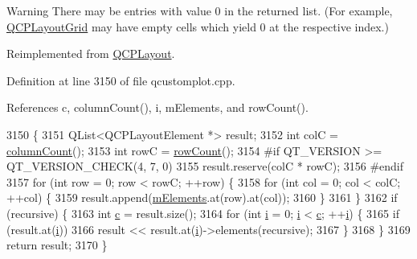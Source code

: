 \begin{DoxyWarning}{Warning}
There may be entries with value 0 in the returned list. (For example, \hyperlink{class_q_c_p_layout_grid}{Q\+C\+P\+Layout\+Grid} may have empty cells which yield 0 at the respective index.) 
\end{DoxyWarning}


Reimplemented from \hyperlink{class_q_c_p_layout_a51fe2675b53e829130b229bc1f7b0f99}{Q\+C\+P\+Layout}.



Definition at line 3150 of file qcustomplot.\+cpp.



References c, column\+Count(), i, m\+Elements, and row\+Count().


\begin{DoxyCode}
3150                                                                       \{
3151   QList<QCPLayoutElement *> result;
3152   \textcolor{keywordtype}{int} colC = \hyperlink{class_q_c_p_layout_grid_ac39074eafd148b82d0762090f258189e}{columnCount}();
3153   \textcolor{keywordtype}{int} rowC = \hyperlink{class_q_c_p_layout_grid_af8e6c7a05864ebe610c87756c7b9079c}{rowCount}();
3154 \textcolor{preprocessor}{#if QT\_VERSION >= QT\_VERSION\_CHECK(4, 7, 0)}
3155   result.reserve(colC * rowC);
3156 \textcolor{preprocessor}{#endif}
3157   \textcolor{keywordflow}{for} (\textcolor{keywordtype}{int} row = 0; row < rowC; ++row) \{
3158     \textcolor{keywordflow}{for} (\textcolor{keywordtype}{int} col = 0; col < colC; ++col) \{
3159       result.append(\hyperlink{class_q_c_p_layout_grid_a2ec4664bcfb5d479255e50f0c074f7c9}{mElements}.at(row).at(col));
3160     \}
3161   \}
3162   \textcolor{keywordflow}{if} (recursive) \{
3163     \textcolor{keywordtype}{int} \hyperlink{_comparision_pictures_2_createtest_image_8m_ae0323a9039add2978bf5b49550572c7c}{c} = result.size();
3164     \textcolor{keywordflow}{for} (\textcolor{keywordtype}{int} \hyperlink{_comparision_pictures_2_createtest_image_8m_a6f6ccfcf58b31cb6412107d9d5281426}{i} = 0; \hyperlink{_comparision_pictures_2_createtest_image_8m_a6f6ccfcf58b31cb6412107d9d5281426}{i} < \hyperlink{_comparision_pictures_2_createtest_image_8m_ae0323a9039add2978bf5b49550572c7c}{c}; ++\hyperlink{_comparision_pictures_2_createtest_image_8m_a6f6ccfcf58b31cb6412107d9d5281426}{i}) \{
3165       \textcolor{keywordflow}{if} (result.at(\hyperlink{_comparision_pictures_2_createtest_image_8m_a6f6ccfcf58b31cb6412107d9d5281426}{i}))
3166         result << result.at(\hyperlink{_comparision_pictures_2_createtest_image_8m_a6f6ccfcf58b31cb6412107d9d5281426}{i})->elements(recursive);
3167     \}
3168   \}
3169   \textcolor{keywordflow}{return} result;
3170 \}
\end{DoxyCode}


